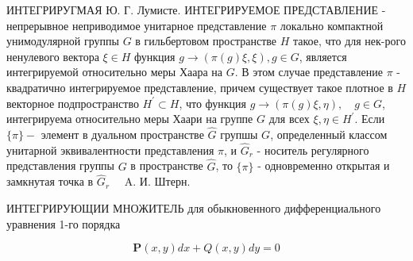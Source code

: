 \documentclass[10pt]{article}
\begin{document}
ИНТЕГРИРУГМАЯ Ю. Г. Лумисте. ИНТЕГРИРУЕМОЕ ПРЕДСТАВЛЕНИЕ - непрерывное неприводимое унитарное представление $\pi$ локально компактной унимодулярной группы $G$ в гильбертовом пространстве $H$ такое, что для нек-рого ненулевого вектора $\xi \in H$ функция $g \rightarrow(\pi(g) \xi, \xi), g \in G$, является интегрируемой относительно меры Хаара на $G$. В этом случае представление $\pi$ - квадратично интегрируемое представление, причем существует такое плотное в $H$ векторное подпространство $H^{\prime} \subset H$, что функция $g \rightarrow(\pi(g) \xi, \eta), \quad g \in G$, интегрируема относительно меры Хаари на группе $G$ для всех $\xi, \eta \in H^{\prime}$. Если $\{\pi\}-$ элемент в дуальном пространстве $\hat{G}$ групшы $G$, определенный классом унитарной эквивалентности представления $\pi$, и $\widehat{G}_{r}$ - носитель регулярного представления группы $G$ в пространстве $\hat{G}$, то $\{\pi\}$ - одновременно открытая и замкнутая точка в $\hat{G}_{r} \quad$ A. И. Штерн.



ИНТЕГРИРУЮЩИИ МНОЖИТЕЛЬ для обыкновенного дифференциального уравнения 1-го порядка



\[

\boldsymbol{P}(x, y) d x+Q(x, y) d y=0

\]
\end{document}
